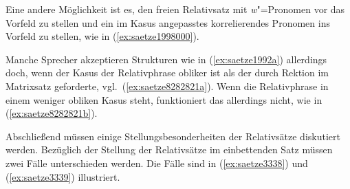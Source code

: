 \Enl[0.5]

\begin{exe}
\end{exe}

Eine andere Möglichkeit ist es, den freien Relativsatz mit \textit{w}"=Pronomen vor das Vorfeld zu stellen und ein im Kasus angepasstes korrelierendes Pronomen ins Vorfeld zu stellen, wie in (\ref{ex:saetze1998000}).

\begin{exe}
\end{exe}

Manche Sprecher akzeptieren Strukturen wie in (\ref{ex:saetze1992a}) allerdings doch, wenn der Kasus der Relativphrase obliker ist als der durch Rektion im Matrixsatz geforderte, vgl.\ (\ref{ex:saetze8282821a}).
Wenn die Relativphrase in einem weniger obliken Kasus steht, funktioniert das allerdings nicht, wie in (\ref{ex:saetze8282821b}).

\begin{exe}
  \ex\label{ex:saetze8282821} 
  \begin{xlist}
  \end{xlist}
\end{exe}

Abschließend müssen einige Stellungsbesonderheiten der Relativsätze diskutiert werden. 
Bezüglich der Stellung der Relativsätze im einbettenden Satz müssen zwei Fälle unterschieden werden.
Die Fälle sind in (\ref{ex:saetze3338}) und (\ref{ex:saetze3339}) illustriert.

\begin{exe}
  \ex\label{ex:saetze3338}
  \begin{xlist}
  \end{xlist}
  \ex\label{ex:saetze3339}
  \begin{xlist}
  \end{xlist}
\end{exe}

